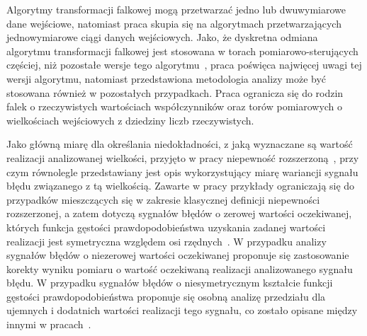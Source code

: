 Algorytmy transformacji falkowej mogą przetwarzać jedno lub dwuwymiarowe dane wejściowe, natomiast praca skupia się na algorytmach przetwarzających jednowymiarowe ciągi danych wejściowych. Jako, że dyskretna odmiana algorytmu transformacji falkowej jest stosowana w torach pomiarowo-sterujących częściej, niż pozostałe wersje tego algorytmu~\cite{wallen_handbook, lord_guide, akujuobi_applications}, praca poświęca najwięcej uwagi tej wersji algorytmu, natomiast przedstawiona metodologia analizy może być stosowana również w pozostałych przypadkach. Praca ogranicza się do rodzin falek o rzeczywistych wartościach współczynników oraz torów pomiarowych o wielkościach wejściowych z dziedziny liczb rzeczywistych.

Jako główną miarę dla określania niedokładności, z jaką wyznaczane są wartość realizacji analizowanej wielkości, przyjęto w pracy niepewność rozszerzoną~\cite{jcgm_guide}, przy czym równolegle przedstawiany jest opis wykorzystujący miarę wariancji sygnału błędu związanego z tą wielkością. Zawarte w pracy przykłady ograniczają się do przypadków mieszczących się w zakresie klasycznej definicji niepewności rozszerzonej, a zatem dotyczą sygnałów błędów o zerowej wartości oczekiwanej, których funkcja gęstości prawdopodobieństwa uzyskania zadanej wartości realizacji jest symetryczna względem osi rzędnych~\cite{jcgm_guide}. W przypadku analizy sygnałów błędów o niezerowej wartości oczekiwanej proponuje się zastosowanie korekty wyniku pomiaru o wartość oczekiwaną realizacji analizowanego sygnału błędu. W przypadku sygnałów błędów o niesymetrycznym kształcie funkcji gęstości prawdopodobieństwa proponuje się osobną analizę przedziału dla ujemnych i dodatnich wartości realizacji tego sygnału, co zostało opisane między innymi w pracach~\cite{roj_annuncertainty, wymyslo_range, jakubiec_system}.
